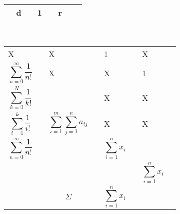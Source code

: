 \documentclass[a4paper]{article}
\begin{document}
\noindent
\begin{tabular}{|p{0.15cm}|p{0.1cm} p{0.1cm}|p{0.1cm} p{0.1cm}|p{0.1cm} p{0.1cm}|p{0.05cm}|}
\hline
 & d & & 1 & & r & & \\
\hline
\end{tabular} \\
\begin{tabular}{|p{0.1cm} p{0.1cm}|p{0.1cm} p{0.1cm}|p{0.1cm} p{0.1cm}|p{0.1cm} p{0.1cm}|}
X & & X & & 1 & & X & \\
\[  \sum_{n=0}^{\infty} \frac{1}{n!} \] & & X & & X & & 1 & \\
\[ \sum_{k=0}^{N} \frac{1}{k!} \] & &  & & X & & X & \\
\[ \sum_{i=0}^{k} \frac{1}{i!} \] & & \[  \sum_{i=1}^{m}\sum_{j=1}^{n} a_{ij} \] & & X & & X & \\
\[ \sum_{n=0}^{\infty} \frac{1}{n!} \]  & &   & & \[ \sum_{i=1}^{n} x_i \]  & &   & \\
  & &   & &   & & \[ \sum\limits_{i=1}^{n} x_i \]  & \\
  & & \[ \Sigma \]  & &  \[ \sum\limits_{i=1}^{n} x_i \] & &   & \\
\hline

\end{tabular}
\end{document}
